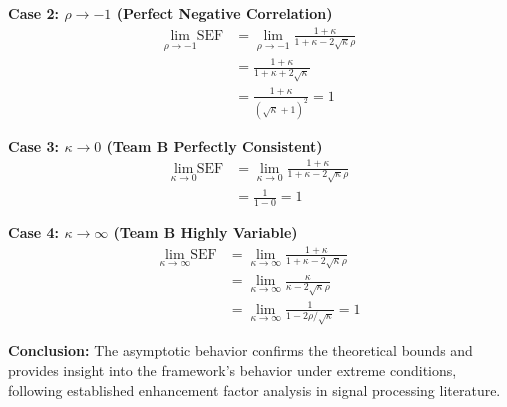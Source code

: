 \textbf{Case 2: $\rho \to -1$ (Perfect Negative Correlation)}
\begin{align}
\lim_{\rho \to -1} \text{SEF} &= \lim_{\rho \to -1} \frac{1 + \kappa}{1 + \kappa - 2\sqrt{\kappa}\rho} \\
&= \frac{1 + \kappa}{1 + \kappa + 2\sqrt{\kappa}} \\
&= \frac{1 + \kappa}{(\sqrt{\kappa} + 1)^2} = 1
\end{align}

\textbf{Case 3: $\kappa \to 0$ (Team B Perfectly Consistent)}
\begin{align}
\lim_{\kappa \to 0} \text{SEF} &= \lim_{\kappa \to 0} \frac{1 + \kappa}{1 + \kappa - 2\sqrt{\kappa}\rho} \\
&= \frac{1}{1 - 0} = 1
\end{align}

\textbf{Case 4: $\kappa \to \infty$ (Team B Highly Variable)}
\begin{align}
\lim_{\kappa \to \infty} \text{SEF} &= \lim_{\kappa \to \infty} \frac{1 + \kappa}{1 + \kappa - 2\sqrt{\kappa}\rho} \\
&= \lim_{\kappa \to \infty} \frac{\kappa}{\kappa - 2\sqrt{\kappa}\rho} \\
&= \lim_{\kappa \to \infty} \frac{1}{1 - 2\rho/\sqrt{\kappa}} = 1
\end{align}

\textbf{Conclusion:} The asymptotic behavior confirms the theoretical bounds and provides insight into the framework's behavior under extreme conditions, following established enhancement factor analysis in signal processing literature.
